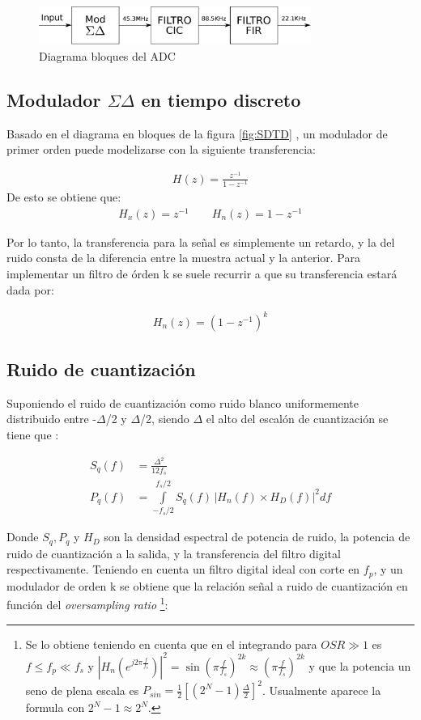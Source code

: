 \documentclass[a4paper,conference]{IEEEtran}
\begin{document}
\begin{figure}[!t]
\centering
\includegraphics[width=3.5in]{Diagrama_Sistema_ADC.eps}
\caption{Diagrama bloques del ADC}
\label{fig:DBADC}
\end{figure}

\subsection{Modulador $\Sigma\Delta$ en tiempo discreto}
Basado en el diagrama en bloques de la figura \ref{fig:SDTD} , un modulador de primer orden puede modelizarse con la siguiente transferencia:

\begin{align}
H(z)=\frac{z^{-1}}{1-z^{-1}}
\end{align}
De esto se obtiene que:
\begin{align}
H_x(z)=z^{-1} \qquad
H_n(z)=1-z^{-1}
\end{align}

Por lo tanto, la transferencia para la señal es simplemente un retardo, y la del ruido consta de la diferencia entre la muestra actual y la anterior.
Para implementar un filtro de \'orden k se suele recurrir a que su transferencia estará dada por:

\begin{align}
H_n(z)=\left( 1-z^{-1}\right)^{k}
\end{align}

\subsection{Ruido de cuantizaci\'on}
Suponiendo el ruido de cuantización como ruido blanco uniformemente distribuido entre -$\Delta$/2 y $\Delta$/2, siendo $\Delta$ el alto del escal\'on de cuantización se tiene que \cite{Tesis:Hellman}:

\begin{align}
S_q(f) &= \frac{\Delta^{2}}{12f_s}\\
P_{q}(f) &=\int\limits_{-f_s/2}^{f_s/2}S_q(f) \, |H_n(f) \times H_D(f)|^{2} df
\end{align}

Donde $S_q,P_q$ y $H_D$ son la densidad espectral de potencia de ruido, la potencia de ruido de cuantizaci\'on a la salida, y la transferencia del filtro digital respectivamente.
Teniendo en cuenta un filtro digital ideal con corte en $f_p$, y un modulador de orden k se obtiene que la relaci\'on se\~nal a ruido de cuantizaci\'on en funci\'on del \textit{oversampling ratio}
\footnote[1]
{
Se lo obtiene teniendo en cuenta que en el integrando para $OSR\gg 1$ es $f\leq f_p\ll f_s$ y $|H_n(e^{j2 \pi \frac{f}{f_s}})|^{2}= \sin(\pi \frac{f}{f_s})^{2k} \approx (\pi\frac{f}{f_s})^{2k}$ y que la potencia un seno de plena escala es $P_{sin}=\frac{1}{2} [(2^N-1)\frac{\Delta}{2}]^{2}$.
Usualmente aparece la formula con $2^{N}-1\approx2^N$.
}:
\end{document}
